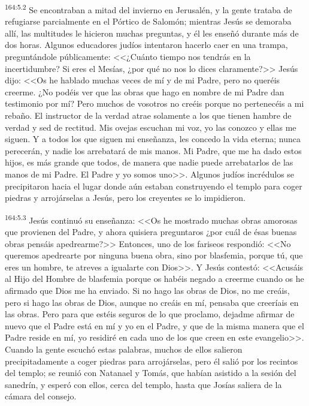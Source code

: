 \par 
\textsuperscript{164:5.2} Se encontraban a mitad del invierno en Jerusalén, y la gente trataba de refugiarse parcialmente en el Pórtico de Salomón; mientras Jesús se demoraba allí, las multitudes le hicieron muchas preguntas, y él les enseñó durante más de dos horas. Algunos educadores judíos intentaron hacerlo caer en una trampa, preguntándole públicamente: <<¿Cuánto tiempo nos tendrás en la incertidumbre? Si eres el Mesías, ¿por qué no nos lo dices claramente?>> Jesús dijo: <<Os he hablado muchas veces de mí y de mi Padre, pero no queréis creerme. ¿No podéis ver que las obras que hago en nombre de mi Padre dan testimonio por mí? Pero muchos de vosotros no creéis porque no pertenecéis a mi rebaño. El instructor de la verdad atrae solamente a los que tienen hambre de verdad y sed de rectitud. Mis ovejas escuchan mi voz, yo las conozco y ellas me siguen. Y a todos los que siguen mi enseñanza, les concedo la vida eterna; nunca perecerán, y nadie los arrebatará de mis manos. Mi Padre, que me ha dado estos hijos, es más grande que todos, de manera que nadie puede arrebatarlos de las manos de mi Padre. El Padre y yo somos uno>>. Algunos judíos incrédulos se precipitaron hacia el lugar donde aún estaban construyendo el templo para coger piedras y arrojárselas a Jesús, pero los creyentes se lo impidieron.

\par 
\textsuperscript{164:5.3} Jesús continuó su enseñanza: <<Os he mostrado muchas obras amorosas que provienen del Padre, y ahora quisiera preguntaros ¿por cuál de ésas buenas obras pensáis apedrearme?>> Entonces, uno de los fariseos respondió: <<No queremos apedrearte por ninguna buena obra, sino por blasfemia, porque tú, que eres un hombre, te atreves a igualarte con Dios>>. Y Jesús contestó: <<Acusáis al Hijo del Hombre de blasfemia porque os habéis negado a creerme cuando os he afirmado que Dios me ha enviado. Si no hago las obras de Dios, no me creáis, pero si hago las obras de Dios, aunque no creáis en mí, pensaba que creeríais en las obras. Pero para que estéis seguros de lo que proclamo, dejadme afirmar de nuevo que el Padre está en mí y yo en el Padre, y que de la misma manera que el Padre reside en mí, yo residiré en cada uno de los que creen en este evangelio>>. Cuando la gente escuchó estas palabras, muchos de ellos salieron precipitadamente a coger piedras para arrojárselas, pero él salió por los recintos del templo; se reunió con Natanael y Tomás, que habían asistido a la sesión del sanedrín, y esperó con ellos, cerca del templo, hasta que Josías saliera de la cámara del consejo.

